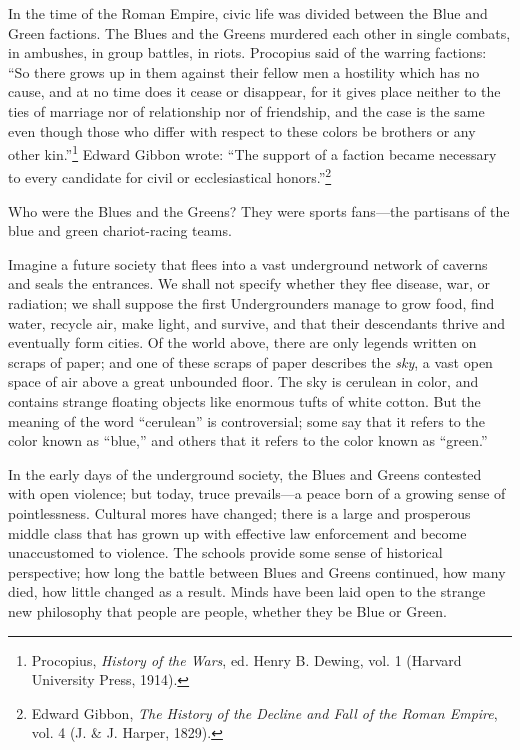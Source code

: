 {
 In the time of the Roman Empire, civic life was divided between
the Blue and Green factions. The Blues and the Greens murdered each
other in single combats, in ambushes, in group battles, in riots.
Procopius said of the warring factions: ``So there
grows up in them against their fellow men a hostility which has no
cause, and at no time does it cease or disappear, for it gives place
neither to the ties of marriage nor of relationship nor of friendship,
and the case is the same even though those who differ with respect to
these colors be brothers or any other
kin.''\footnote{Procopius, \textit{History of the Wars}, ed. Henry B. Dewing,
vol. 1 (Harvard University Press, 1914).} Edward Gibbon wrote:
``The support of a faction became necessary to every
candidate for civil or ecclesiastical
honors.''\footnote{Edward Gibbon, \textit{The History of the Decline and Fall of
the Roman Empire}, vol. 4 (J. \& J. Harper, 1829).} }

{
 Who were the Blues and the Greens? They were sports fans---the
partisans of the blue and green chariot-racing teams.}

{
 Imagine a future society that flees into a vast underground
network of caverns and seals the entrances. We shall not specify
whether they flee disease, war, or radiation; we shall suppose the
first Undergrounders manage to grow food, find water, recycle air, make
light, and survive, and that their descendants thrive and eventually
form cities. Of the world above, there are only legends written on
scraps of paper; and one of these scraps of paper describes the
\textit{sky}, a vast open space of air above a great unbounded floor.
The sky is cerulean in color, and contains strange floating objects
like enormous tufts of white cotton. But the meaning of the word
``cerulean'' is controversial; some
say that it refers to the color known as
``blue,'' and others that it refers
to the color known as ``green.''}

{
 In the early days of the underground society, the Blues and Greens
contested with open violence; but today, truce prevails---a peace born
of a growing sense of pointlessness. Cultural mores have changed; there
is a large and prosperous middle class that has grown up with effective
law enforcement and become unaccustomed to violence. The schools
provide some sense of historical perspective; how long the battle
between Blues and Greens continued, how many died, how little changed
as a result. Minds have been laid open to the strange new philosophy
that people are people, whether they be Blue or Green.}

